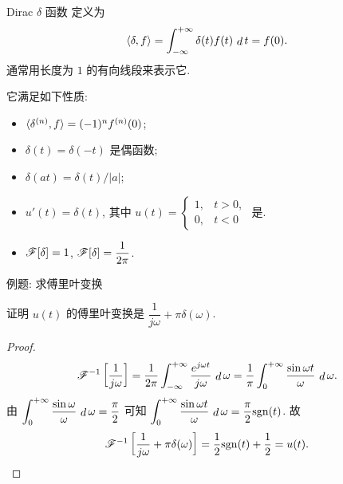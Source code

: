 \begin{frame}{Dirac $\delta$ 函数}
\onslide<+->
定义为
\[\langle{\delta,f}\rangle=\int_{-\infty}^{+\infty}\delta(t)f(t)\,\mathop{d} t=f(0).\]
\onslide<+->
通常用长度为 $1$ 的有向线段来表示它.


\onslide<+->
它满足如下性质:
\begin{itemize}
\item $\langle{\delta^{(n)},f}\rangle=(-1)^nf^{(n)}(0)$;
\item $\delta(t)=\delta(-t)$ 是偶函数;
\item $\delta(at)=\delta(t)/|a|$;
\item $u'(t)=\delta(t)$, 其中 $u(t)=\begin{cases}1,&t>0,\\0,&t<0\end{cases}$ 是.
\item $\mathscr{F}[\delta]=1$, $\mathscr{F}[\delta]=\dfrac1{2\pi}$.
\end{itemize}
\end{frame}


\begin{frame}{例题: 求傅里叶变换}
\begin{example}
证明 $u(t)$ 的傅里叶变换是 $\dfrac1{j\omega}+\pi\delta(\omega)$.
\end{example}
\begin{proof}
\[\mathscr{F}^{-1}\left[\frac1{j\omega}\right]
=\frac1{2\pi}\int_{-\infty}^{+\infty}\frac{e^{j\omega t}}{j\omega} \,\mathop{d}\omega
=\frac1\pi\int_0^{+\infty}\frac{\sin{\omega t}}{\omega} \,\mathop{d}\omega.\]
\onslide<+->
由 $\displaystyle\int_0^{+\infty}\frac{\sin\omega}\omega \,\mathop{d}\omega=\dfrac\pi2$
可知 $\displaystyle\int_0^{+\infty}\frac{\sin{\omega t}}\omega \,\mathop{d}\omega=\frac\pi2{\mathrm{sgn}}(t)$.
\onslide<+->
故
\[\mathscr{F}^{-1} \left[\frac1{j\omega}+\pi\delta(\omega)\right]
=\frac12{\mathrm{sgn}}(t)+\frac12=u(t).\qedhere\]
\end{proof}
\end{frame}
